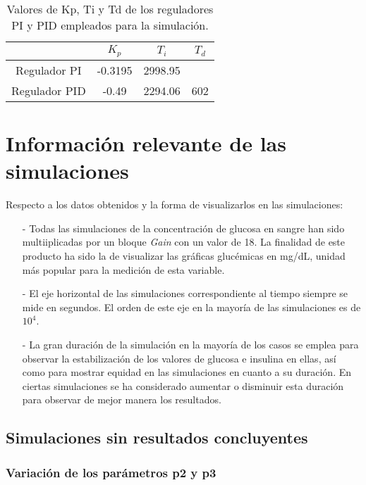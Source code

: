 \begin{table}[htbp]
    \centering
    \caption{Valores de Kp, Ti y Td de los reguladores PI y PID empleados para la simulación.}
    \begin{tabular}{|c|c|c|c|}
        \hline
          & $K_p$ &  $T_i$ &  $T_d$ \\
        \hline
        Regulador PI & -0.3195 & 2998.95 &  \\
        Regulador PID &  -0.49 & 2294.06 & 602 \\
        \hline
    \end{tabular}
    \label{tab:val_PI_PID}
\end{table}


\section{Información relevante de las simulaciones}
    
Respecto a los datos obtenidos y la forma de visualizarlos en las simulaciones:
\begin{enumerate}
    \item[-] Todas las simulaciones de la concentración de glucosa en sangre han sido multiiplicadas por un bloque \textit{Gain} con un valor de 18. La finalidad de este producto ha sido la de visualizar las gráficas glucémicas en mg/dL, unidad más popular para la medición de esta variable.
    \item[-] El eje horizontal de las simulaciones correspondiente al tiempo siempre se mide en segundos. El orden de este eje en la mayoría de las simulaciones es de $10 ^4$.
    \item[-] La gran duración de la simulación en la mayoría de los casos se emplea para observar la estabilización de los valores de glucosa e insulina en ellas, así como para mostrar equidad en las simulaciones en cuanto a su duración. En ciertas simulaciones se ha considerado aumentar o disminuir esta duración para observar de mejor manera los resultados.
\end{enumerate}


\subsection{Simulaciones sin resultados concluyentes}

\subsubsection{Variación de los parámetros p2 y p3}
\label{sec:variacion_p23}

